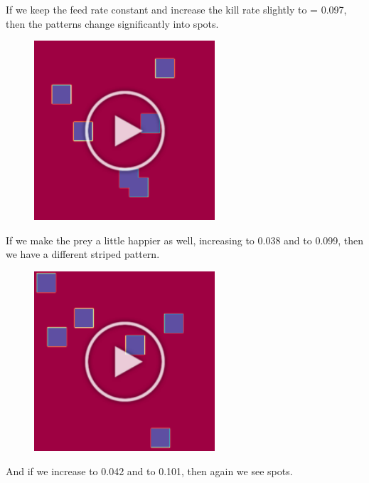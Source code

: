 {{If we keep the feed rate constant and increase the kill rate slightly to  = 0.097, then the patterns change significantly into spots.

\begin{figure}[h]
\centering
\mySfFamily
\includegraphics[width = 0.6\textwidth]{../images/gray-scott_f34_k63_first_frame.png}
\caption{}
\label{fig:gray-scott_f34_k63_first_frame}
\end{figure}

If we make the prey a little happier as well, increasing   to 0.038 and  to 0.099, then we have a different striped pattern.

\begin{figure}[h]
\centering
\mySfFamily
\includegraphics[width = 0.6\textwidth]{../images/gray-scott_f38_k61_first_frame.png}
\caption{}
\label{fig:gray-scott_f38_k61_first_frame}
\end{figure}

And if we increase  to 0.042 and  to 0.101, then again we see spots.

}}
